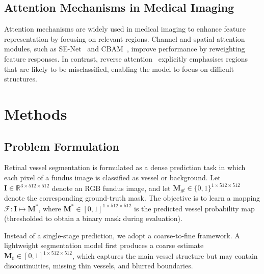 \documentclass[jimaging,article,submit,pdftex,moreauthors]{Definitions/mdpi}%
\begin{document}
\subsection{Attention Mechanisms in Medical Imaging}



Attention mechanisms are widely used in medical imaging to enhance feature representation by focusing on relevant regions. Channel and spatial attention modules, such as SE-Net~\cite{Hu2018} and CBAM~\cite{Woo2018}, improve performance by reweighting feature responses. In contrast, reverse attention~\cite{Hernandez2025} explicitly emphasises regions that are likely to be misclassified, enabling the model to focus on difficult structures.






\section{Methods}

\label{sec:methods}



\subsection{Problem Formulation}

\label{sec:problem}



Retinal vessel segmentation is formulated as a dense prediction task in which each pixel of a fundus image is classified as vessel or background. Let $\mathbf{I}\in\mathbb{R}^{3\times512\times512}$ denote an RGB fundus image, and let $\mathbf{M}_{gt}\in\{0,1\}^{1\times512\times512}$ denote the corresponding ground-truth mask. The objective is to learn a mapping $\mathcal{F}:\mathbf{I}\mapsto \mathbf{M}^*$, where $\mathbf{M}^*\in[0,1]^{1\times512\times512}$ is the predicted vessel probability map (thresholded to obtain a binary mask during evaluation).



Instead of a single-stage prediction, we adopt a coarse-to-fine framework. A lightweight segmentation model first produces a coarse estimate $\mathbf{M}_0\in[0,1]^{1\times512\times512}$, which captures the main vessel structure but may contain discontinuities, missing thin vessels, and blurred boundaries.
\end{document}
